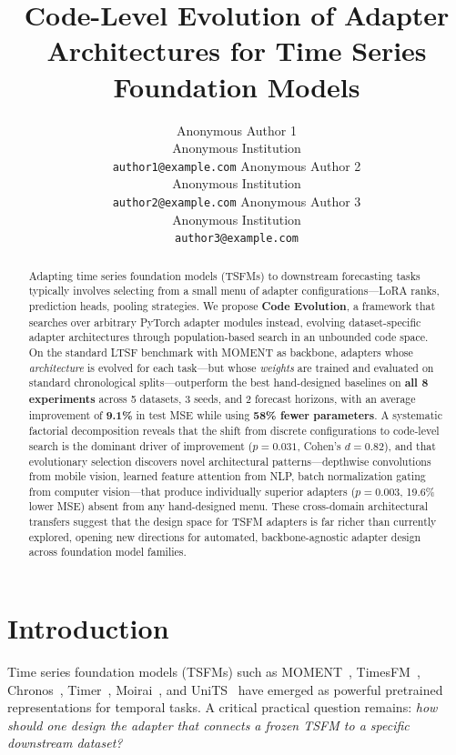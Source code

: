 \documentclass{article}
\title{Code-Level Evolution of Adapter Architectures for Time Series Foundation Models}
\author{
  Anonymous Author 1 \\
  Anonymous Institution\\
  \texttt{author1@example.com}
  \And
  Anonymous Author 2 \\
  Anonymous Institution\\
  \texttt{author2@example.com}
  \And
  Anonymous Author 3 \\
  Anonymous Institution\\
  \texttt{author3@example.com}
}
\begin{document}
\maketitle

\begin{abstract}
Adapting time series foundation models (TSFMs) to downstream forecasting tasks typically involves selecting from a small menu of adapter configurations---LoRA ranks, prediction heads, pooling strategies. We propose \textbf{Code Evolution}, a framework that searches over arbitrary PyTorch adapter modules instead, evolving dataset-specific adapter architectures through population-based search in an unbounded code space. On the standard LTSF benchmark with MOMENT as backbone, adapters whose \textit{architecture} is evolved for each task---but whose \textit{weights} are trained and evaluated on standard chronological splits---outperform the best hand-designed baselines on \textbf{all 8 experiments} across 5 datasets, 3 seeds, and 2 forecast horizons, with an average improvement of \textbf{9.1\%} in test MSE while using \textbf{58\% fewer parameters}. A systematic factorial decomposition reveals that the shift from discrete configurations to code-level search is the dominant driver of improvement ($p{=}0.031$, Cohen's $d{=}0.82$), and that evolutionary selection discovers novel architectural patterns---depthwise convolutions from mobile vision, learned feature attention from NLP, batch normalization gating from computer vision---that produce individually superior adapters ($p{=}0.003$, 19.6\% lower MSE) absent from any hand-designed menu. These cross-domain architectural transfers suggest that the design space for TSFM adapters is far richer than currently explored, opening new directions for automated, backbone-agnostic adapter design across foundation model families.
\end{abstract}

\section{Introduction}

Time series foundation models (TSFMs) such as MOMENT~\cite{goswami2024moment}, TimesFM~\cite{das2024timesfm}, Chronos~\cite{ansari2024chronos}, Timer~\cite{liu2024timer}, Moirai~\cite{woo2024moirai}, and UniTS~\cite{lee2024units} have emerged as powerful pretrained representations for temporal tasks. A critical practical question remains: \textit{how should one design the adapter that connects a frozen TSFM to a specific downstream dataset?}
\end{document}
